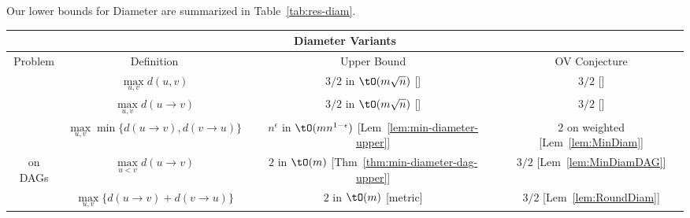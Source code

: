 Our lower bounds for Diameter are summarized in Table~\ref{tab:res-diam}.

\begin{table*}\centering\small
\begin{tabular}{|c | c | c | c|}
\hline 
\multicolumn{4}{|c|}{Diameter Variants} \\
\hline
Problem & Definition & Upper Bound & OV Conjecture \\
\hline
  \UndirectedDiameter{} &
  $\max\limits_{u,v} d(u,v)$ &
  $3/2$ in $\tO(m\sqrt{n})$ [\cite{RV13}] &
  $3/2$  [\cite{RV13}]\\
\hline
  \MaxDiameter{} &
  $\max\limits_{u,v} d(u \to v)$ &
  $3/2$ in $\tO(m\sqrt{n})$ [\cite{RV13}] &
  $3/2$ [\cite{RV13}] \\
\hline
  \MinDiameter{} &
  $\max\limits_{u,v} \min\{d(u \to v), d(v \to u)\}$ &
  $n^\epsilon$ in $\tO(mn^{1-\epsilon})$ [Lem~\ref{lem:min-diameter-upper}] &
  $2$ on weighted  [Lem~\ref{lem:MinDiam}] \\
\hline
  \MinDiameter{} on DAGs &
  $\max\limits_{u<v} d(u \to v)$ &
  $2$ in $\tO(m)$ [Thm~\ref{thm:min-diameter-dag-upper}] &
  $3/2$  [Lem~\ref{lem:MinDiamDAG}] \\
\hline
  \RoundtripDiameter{} &
  $\max\limits_{u,v} \{d(u \to v) + d(v \to u)\}$ &
  $2$ in $\tO(m)$ [metric]&
  $3/2$ [Lem~\ref{lem:RoundDiam}] \\
\hline
\end{tabular}
\caption{Our Bounds for Various Diameter Problems}
\label{tab:res-diam}
\end{table*}

